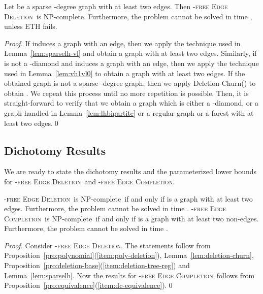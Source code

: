 \documentclass[envcountsame,envcountsect,10pt,oribibl]{llncs}
\newcommand{\pname}[1]{\textnormal{\textsc{#1}}}
\newcommand{\cclass}[1]{\textnormal{\textsf{#1}}}
\newcommand{\HED}{\pname{-free Edge Deletion}}
\newcommand{\HEC}{\pname{-free Edge Completion}}
\newcommand{\HDED}{\pname{-free Edge Deletion}}
\newcommand{\NPC}{\cclass{NP-complete}}
\begin{document}
\begin{lemma}
  \label{lem:sparselh}
  Let  be a sparse -degree graph with at least two edges.
  Then \HED\ is \NPC. Furthermore, the problem cannot be solved in time
  , unless ETH fails.
\end{lemma}
\begin{proof}
  If  induces a graph with an edge, then we apply
  the technique used in Lemma~\ref{lem:sparselh-vl} and obtain
  a graph  with at least two edges. Similarly, if  is 
  not a -diamond and  induces a graph with an edge,
  then we apply the technique used in Lemma~\ref{lem:vh1vl0} to obtain
  a graph  with at least two edges. If the obtained graph 
  is not a sparse -degree graph, then we apply 
  Deletion-Churn() to obtain . We repeat this process until no more
  repetition is possible. Then, it is straight-forward to verify that
  we obtain a graph which is either a -diamond, or a graph handled in Lemma~\ref{lem:lhbipartite} or
  a regular graph or a forest with at least two edges.\qed
\end{proof}
\begin{comment}
We observe that in all the four cases, we either give a direct reduction and prove 
that the problem is \NPC\ or give a reduction from \HDED\ where  is a 
graph with at least two edges and has less number of vertices compared to .

\begin{theorem}
  \label{thm:}
  Let  be a sparse -graph with at least two edges.
  Then \HED\ is \NPC. Furthermore, the problem cannot be solved 
  in time , unless ETH fails.
\end{theorem}
\end{comment}
\subsection{Dichotomy Results}

We are ready to state the dichotomy results and the 
parameterized lower bounds for \HED\ and \HEC.

\begin{theorem}
  \label{thm:final}
  \HED\ is \NPC\ if and only if  is a graph with at least two edges.
  Furthermore, the problem cannot be solved in time .
  \HEC\ is \NPC\ if and only if  is a graph with at least two non-edges.
  Furthermore, the problem cannot be solved in time .
\end{theorem}
\begin{proof}
  Consider \HED. The statements follow from 
  Proposition~\ref{pro:polynomial}(\ref{item:poly-deletion}), Lemma~\ref{lem:deletion-churn}, 
  Proposition~\ref{pro:deletion-base}(\ref{item:deletion-tree-reg}) and Lemma~\ref{lem:sparselh}.
  Now the results for \HEC\ follows from Proposition~\ref{pro:equivalence}(\ref{item:dc-equivalence}).\qed
\end{proof}
\end{document}
